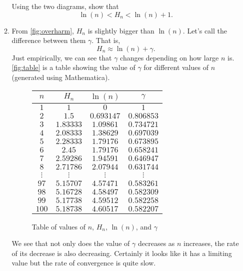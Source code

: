 \documentclass[a4paper,10pt]{article}
\begin{document}
\begin{enumerate}
\begin{enumerate}
Using the two diagrams, show that \[\ln(n)<H_n<\ln(n)+1.\]
\item From \autoref{fig:overharm}, \(H_n\) is slightly bigger than
  \(\ln(n)\). Let's call the difference between them \(\gamma\). That is,
  \[H_n\approx \ln(n)+\gamma.\]
  Just empirically, we can see that \(\gamma\) changes depending on how large \(n\) is. \autoref{fig:table} is 
  a table showing the value of \(\gamma\) for different values of \(n\)
  (generated using Mathematica).
  \begin{figure}[h]
  \begin{center}
    \begin{tabular}{|c|c|c|c|}
      \hline
      \(n\)&\(H_n\)&\(\ln(n)\)&\(\gamma\)\\
      \hline
      \(1\)&\(1\)&\(0\)&\(1\)\\
      \(2\)&\(1.5\)&\(0.693147\)&\(0.806853\)\\
      \(3\)&\(1.83333\)&\(1.09861\)&\(0.734721\)\\
      \(4\)&\(2.08333\)&\(1.38629\)&\(0.697039\)\\
      \(5\)&\(2.28333\)&\(1.79176\)&\(0.673895\)\\
      \(6\)&\(2.45\)&\(1.79176\)&\(0.658241\)\\
      \(7\)&\(2.59286\)&\(1.94591\)&\(0.646947\)\\
      \(8\)&\(2.71786\)&\(2.07944\)&\(0.631744\)\\
      \(\vdots\)&\(\vdots\)&\(\vdots\)&\(\vdots\)\\
      \(97\)&\(5.15707\)&\(4.57471\)&\(0.583261\)\\
      \(98\)&\(5.16728\)&\(4.58497\)&\(0.582309\)\\
      \(99\)&\(5.17738\)&\(4.59512\)&\(0.582258\)\\
      \(100\)&\(5.18738\)&\(4.60517\)&\(0.582207\)\\\hline
    \end{tabular}
  \end{center}
  \caption{Table of values of \(n\), \(H_n\), \(\ln(n)\), and \(\gamma\)}
  \label{fig:table}
  \end{figure}
  We see that not only does the value of \(\gamma\) decreases as \(n\) increases, the rate of its decrease is also decreasing.
  Certainly it looks like it has a limiting value but the rate of convergence is quite slow.


\end{enumerate}
\end{enumerate}
\end{document}
